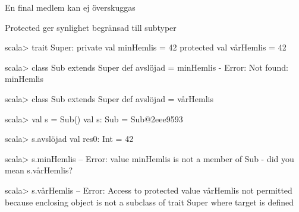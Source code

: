 \begin{Slide}{En final medlem kan ej överskuggas}
\ifkompendium
\vspace{-0.5em}
\else
\vspace{-0.5em}
\fi
\end{Slide}


\begin{Slide}{Protected ger synlighet begränsad till subtyper}
\begin{REPLsmall}
scala> trait Super:
         private val minHemlis = 42
         protected val vårHemlis = 42

scala> class Sub extends Super { def avslöjad = minHemlis }
- Error: Not found: minHemlis

scala> class Sub extends Super { def avslöjad = vårHemlis }

scala> val s = Sub()
val s: Sub = Sub@2eee9593

scala> s.avslöjad
val res0: Int = 42

scala> s.minHemlis
-- Error: 
  value minHemlis is not a member of Sub - did you mean s.vårHemlis?

scala> s.vårHemlis
-- Error: 
  Access to protected value vårHemlis not permitted because enclosing object
  is not a subclass of trait Super where target is defined
\end{REPLsmall}
\end{Slide}


